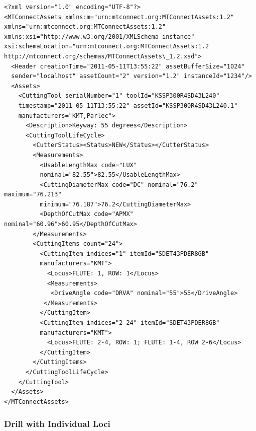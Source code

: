 \begin{lstlisting}[firstnumber=1,escapechar=|,% 
caption={Example for Shell Mill with Explicate Loci}, label={lst:shell-mill-with-explicate-loci}]
<?xml version="1.0" encoding="UTF-8"?>
<MTConnectAssets xmlns:m="urn:mtconnect.org:MTConnectAssets:1.2" 
xmlns="urn:mtconnect.org:MTConnectAssets:1.2" 
xmlns:xsi="http://www.w3.org/2001/XMLSchema-instance" 
xsi:schemaLocation="urn:mtconnect.org:MTConnectAssets:1.2 
http://mtconnect.org/schemas/MTConnectAssets\_1.2.xsd">
  <Header creationTime="2011-05-11T13:55:22" assetBufferSize="1024" 
  sender="localhost" assetCount="2" version="1.2" instanceId="1234"/>
  <Assets>
    <CuttingTool serialNumber="1" toolId="KSSP300R4SD43L240" 
    timestamp="2011-05-11T13:55:22" assetId="KSSP300R4SD43L240.1" 
    manufacturers="KMT,Parlec">
      <Description>Keyway: 55 degrees</Description>
      <CuttingToolLifeCycle>
        <CutterStatus><Status>NEW</Status></CutterStatus>
        <Measurements>
          <UsableLengthMax code="LUX" 
          nominal="82.55">82.55</UsableLengthMax>
          <CuttingDiameterMax code="DC" nominal="76.2" maximum="76.213" 
          minimum="76.187">76.2</CuttingDiameterMax>
          <DepthOfCutMax code="APMX" nominal="60.96">60.95</DepthOfCutMax>
        </Measurements>
        <CuttingItems count="24">
          <CuttingItem indices="1" itemId="SDET43PDER8GB" 
          manufacturers="KMT">
            <Locus>FLUTE: 1, ROW: 1</Locus>
            <Measurements>
             <DriveAngle code="DRVA" nominal="55">55</DriveAngle>
           </Measurements>
          </CuttingItem>
          <CuttingItem indices="2-24" itemId="SDET43PDER8GB" 
          manufacturers="KMT">
            <Locus>FLUTE: 2-4, ROW: 1; FLUTE: 1-4, ROW 2-6</Locus>
          </CuttingItem>
        </CuttingItems>
      </CuttingToolLifeCycle>
    </CuttingTool>
  </Assets>
</MTConnectAssets>
\end{lstlisting}

\pagebreak

\subsubsection{Drill with Individual Loci}

